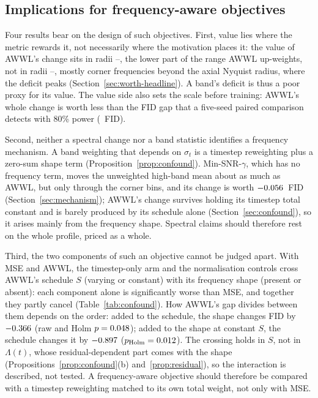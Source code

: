 \subsection{Implications for frequency-aware objectives}
\label{sec:discussion-implications}

Four results bear on the design of such objectives. First, value lies where
the metric rewards it, not necessarily where the motivation places it: the
value of AWWL's change sits in radii \bandMidMin--\bandMidMax{}, the lower
part of the range AWWL up-weights, not in radii
\bandHighMin--\bandHighMax{}, mostly corner frequencies beyond the axial
Nyquist radius, where the deficit peaks (Section~\ref{sec:worth-headline}).
A band's deficit is thus a poor proxy for its value. The value side also
sets the scale before training: AWWL's whole change is worth less than the
FID gap that a five-seed paired comparison detects with 80\% power
(\mdeAWWL~FID).

Second, neither a spectral change nor a band statistic identifies a frequency
mechanism. A band weighting that depends on $\sigma_t$ is a timestep
reweighting plus a zero-sum shape term (Proposition~\ref{prop:confound}).
Min-SNR-$\gamma$, which has no frequency term, moves the unweighted high-band
mean about as much as AWWL, but only through the corner bins, and its change
is worth $-0.056$~FID (Section~\ref{sec:mechanism}); AWWL's change
survives holding its timestep total constant and is barely produced by its
schedule alone (Section~\ref{sec:confound}), so it arises mainly from the
frequency shape. Spectral claims should therefore rest on the whole profile,
priced as a whole.

Third, the two components of such an objective cannot be judged apart. With
MSE and AWWL, the timestep-only arm and the normalisation controls cross
AWWL's schedule $S$ (varying or constant) with its frequency shape (present
or absent): each component alone is significantly worse than MSE, and
together they partly cancel (Table~\ref{tab:confound}). How AWWL's gap
divides between them depends on the order: added to the schedule, the shape
changes FID by $-0.366$ (raw and Holm $p = 0.048$);
added to the shape at constant $S$, the schedule changes it by
$-0.897$ ($p_{\mathrm{Holm}} = 0.012$). The
crossing holds in $S$, not in $\Lambda(t)$, whose residual-dependent part
comes with the shape (Propositions~\ref{prop:confound}(b)
and~\ref{prop:residual}), so the interaction is described, not tested. A
frequency-aware objective should therefore be compared with a timestep
reweighting matched to its own total weight, not only with MSE.


